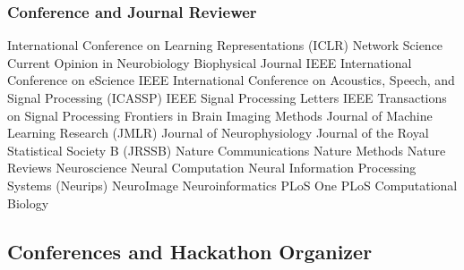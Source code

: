 \documentclass[10pt,colorlinks=true,urlcolor=blue]{moderncv}
\begin{document}
\subsubsection{Conference and Journal Reviewer}
    \cventry {} {International Conference on Learning Representations (ICLR)} {}{}{}{}
    \cventry {} {Network Science} {}{}{}{}
    \cventry {} {Current Opinion in Neurobiology} {}{}{}{}
    \cventry {} {Biophysical Journal} {}{}{}{}
    \cventry {} {IEEE International Conference on eScience} {}{}{}{}
    \cventry {} {IEEE International Conference on Acoustics, Speech, and Signal Processing (ICASSP)}{}{}{}{}
    \cventry {} {IEEE Signal Processing Letters} {} {} {} {}
    \cventry {} {IEEE Transactions on Signal Processing} {}{}{}{}
    \cventry {} {Frontiers in Brain Imaging Methods} {}{}{}{}
    \cventry {} {Journal of Machine Learning Research (JMLR)} {}{}{}{}
    \cventry {} {Journal of Neurophysiology} {}{}{}{}
    \cventry {} {Journal of the Royal Statistical Society B (JRSSB)} {}{}{}{}
    \cventry {} {Nature Communications} {}{}{}{}
    \cventry {} {Nature Methods} {}{}{}{}
    \cventry {} {Nature Reviews Neuroscience} {}{}{}{}
    \cventry {} {Neural Computation} {}{}{}{}
    \cventry {} {Neural Information Processing Systems (Neurips)} {}{}{}{}
    \cventry {} {NeuroImage} {}{}{}{}
    \cventry {} {Neuroinformatics} {}{}{}{}
    \cventry {} {PLoS One} {}{}{}{}
    \cventry {} {PLoS Computational Biology} {}{}{}{}


\subsection{Conferences and Hackathon Organizer}
\end{document}
